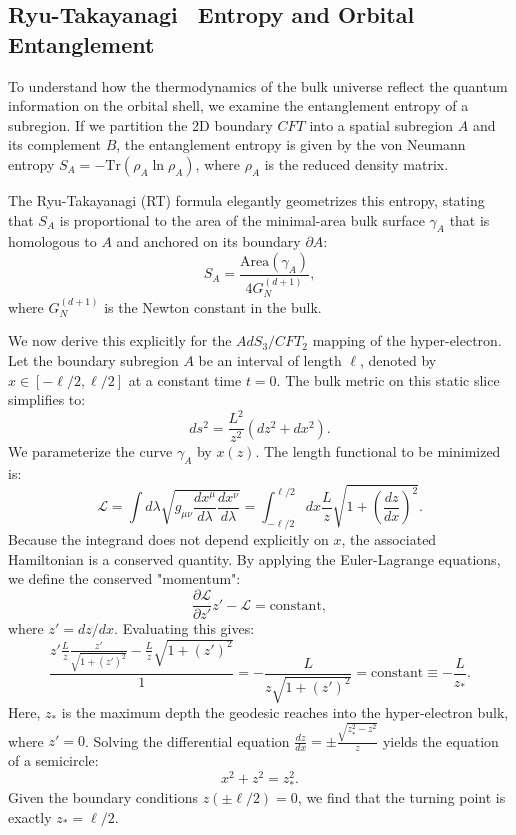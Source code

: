 \subsection{Ryu-Takayanagi~\cite{Ryu2006} Entropy and Orbital Entanglement}

To understand how the thermodynamics of the bulk universe reflect the quantum information on the orbital shell, we examine the entanglement entropy of a subregion. If we partition the 2D boundary $CFT$ into a spatial subregion $A$ and its complement $B$, the entanglement entropy is given by the von Neumann entropy $S_A = -\text{Tr}(\rho_A \ln \rho_A)$, where $\rho_A$ is the reduced density matrix.

The Ryu-Takayanagi (RT) formula elegantly geometrizes this entropy, stating that $S_A$ is proportional to the area of the minimal-area bulk surface $\gamma_A$ that is homologous to $A$ and anchored on its boundary $\partial A$:
\begin{equation}
    S_A = \frac{\text{Area}(\gamma_A)}{4G_N^{(d+1)}},
\end{equation}
where $G_N^{(d+1)}$ is the Newton constant in the bulk. 

We now derive this explicitly for the $AdS_3/CFT_2$ mapping of the hyper-electron. Let the boundary subregion $A$ be an interval of length $\ell$, denoted by $x \in [-\ell/2, \ell/2]$ at a constant time $t=0$. The bulk metric on this static slice simplifies to:
\begin{equation}
    ds^2 = \frac{L^2}{z^2} \left( dz^2 + dx^2 \right).
\end{equation}
We parameterize the curve $\gamma_A$ by $x(z)$. The length functional to be minimized is:
\begin{equation}
    \mathcal{L} = \int d\lambda \sqrt{g_{\mu\nu} \frac{dx^\mu}{d\lambda} \frac{dx^\nu}{d\lambda}} = \int_{-\ell/2}^{\ell/2} dx \frac{L}{z} \sqrt{1 + \left(\frac{dz}{dx}\right)^2}.
\end{equation}
Because the integrand does not depend explicitly on $x$, the associated Hamiltonian is a conserved quantity. By applying the Euler-Lagrange equations, we define the conserved "momentum":
\begin{equation}
    \frac{\partial \mathcal{L}}{\partial z'} z' - \mathcal{L} = \text{constant},
\end{equation}
where $z' = dz/dx$. Evaluating this gives:
\begin{equation}
    \frac{z' \frac{L}{z} \frac{z'}{\sqrt{1+(z')^2}} - \frac{L}{z} \sqrt{1+(z')^2}}{1} = -\frac{L}{z \sqrt{1+(z')^2}} = \text{constant} \equiv -\frac{L}{z_*}.
\end{equation}
Here, $z_*$ is the maximum depth the geodesic reaches into the hyper-electron bulk, where $z' = 0$. Solving the differential equation $\frac{dz}{dx} = \pm \frac{\sqrt{z_*^2 - z^2}}{z}$ yields the equation of a semicircle:
\begin{equation}
    x^2 + z^2 = z_*^2.
\end{equation}
Given the boundary conditions $z(\pm \ell/2) = 0$, we find that the turning point is exactly $z_* = \ell/2$.

